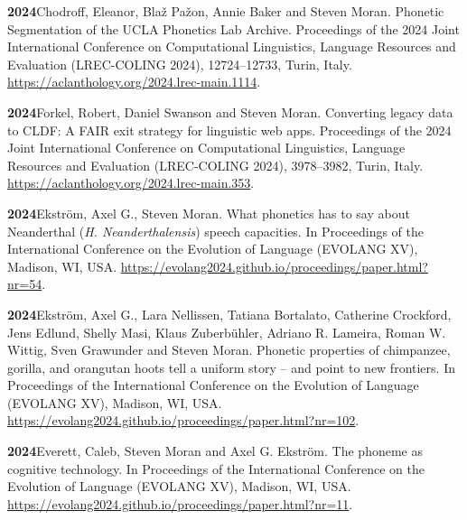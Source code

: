 \documentclass[11pt]{article}
\newcommand{\hangpara}{
 \setlength{\parindent}{0in} %
 \hangindent=0.42in %
}
\begin{document}
\vskip 6pt
\hangpara
{\bf 2024}\hspace{1ex}Chodroff, Eleanor, Blaž Pažon, Annie Baker and Steven Moran. Phonetic Segmentation of the UCLA Phonetics Lab Archive. Proceedings of the 2024 Joint International Conference on Computational Linguistics, Language Resources and Evaluation (LREC-COLING 2024), 12724--12733, Turin, Italy. \url{https://aclanthology.org/2024.lrec-main.1114}. %

\vskip 6pt
\hangpara
{\bf 2024}\hspace{1ex}Forkel, Robert, Daniel Swanson and Steven Moran. Converting legacy data to CLDF: A FAIR exit strategy for linguistic web apps. Proceedings of the 2024 Joint International Conference on Computational Linguistics, Language Resources and Evaluation (LREC-COLING 2024), 3978--3982, Turin, Italy. \url{https://aclanthology.org/2024.lrec-main.353}.

\vskip 6pt
\hangpara
{\bf 2024}\hspace{1ex}Ekstr{\"o}m, Axel G., Steven Moran. What phonetics has to say about Neanderthal (\textit{H. Neanderthalensis}) speech capacities. In  Proceedings of the International Conference on the Evolution of Language (EVOLANG XV), Madison, WI, USA. \url{https://evolang2024.github.io/proceedings/paper.html?nr=54}.

\vskip 6pt
\hangpara
{\bf 2024}\hspace{1ex}Ekstr{\"o}m, Axel G., Lara Nellissen, Tatiana Bortalato, Catherine Crockford, Jens Edlund, Shelly Masi, Klaus Zuberb{\"u}hler, Adriano R. Lameira, Roman W. Wittig, Sven Grawunder and Steven Moran. Phonetic properties of chimpanzee, gorilla, and orangutan hoots tell a uniform story – and point to new frontiers. In Proceedings of the International Conference on the Evolution of Language (EVOLANG XV), Madison, WI, USA. \url{https://evolang2024.github.io/proceedings/paper.html?nr=102}.

\vskip 6pt
\hangpara
{\bf 2024}\hspace{1ex}Everett, Caleb, Steven Moran and Axel G. Ekstr{\"o}m. The phoneme as cognitive technology.  In Proceedings of the International Conference on the Evolution of Language (EVOLANG XV), Madison, WI, USA. \url{https://evolang2024.github.io/proceedings/paper.html?nr=11}.
\end{document}
